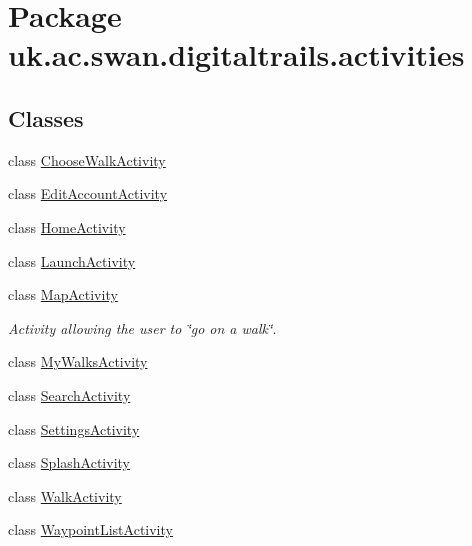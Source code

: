 \hypertarget{namespaceuk_1_1ac_1_1swan_1_1digitaltrails_1_1activities}{\section{Package uk.\+ac.\+swan.\+digitaltrails.\+activities}
\label{namespaceuk_1_1ac_1_1swan_1_1digitaltrails_1_1activities}
}
\subsection*{Classes}
\begin{DoxyCompactItemize}
\item 
class \hyperlink{classuk_1_1ac_1_1swan_1_1digitaltrails_1_1activities_1_1_choose_walk_activity}{Choose\+Walk\+Activity}
\item 
class \hyperlink{classuk_1_1ac_1_1swan_1_1digitaltrails_1_1activities_1_1_edit_account_activity}{Edit\+Account\+Activity}
\item 
class \hyperlink{classuk_1_1ac_1_1swan_1_1digitaltrails_1_1activities_1_1_home_activity}{Home\+Activity}
\item 
class \hyperlink{classuk_1_1ac_1_1swan_1_1digitaltrails_1_1activities_1_1_launch_activity}{Launch\+Activity}
\item 
class \hyperlink{classuk_1_1ac_1_1swan_1_1digitaltrails_1_1activities_1_1_map_activity}{Map\+Activity}
\begin{DoxyCompactList}\small\item\em Activity allowing the user to \char`\"{}go on a walk\char`\"{}. \end{DoxyCompactList}\item 
class \hyperlink{classuk_1_1ac_1_1swan_1_1digitaltrails_1_1activities_1_1_my_walks_activity}{My\+Walks\+Activity}
\item 
class \hyperlink{classuk_1_1ac_1_1swan_1_1digitaltrails_1_1activities_1_1_search_activity}{Search\+Activity}
\item 
class \hyperlink{classuk_1_1ac_1_1swan_1_1digitaltrails_1_1activities_1_1_settings_activity}{Settings\+Activity}
\item 
class \hyperlink{classuk_1_1ac_1_1swan_1_1digitaltrails_1_1activities_1_1_splash_activity}{Splash\+Activity}
\item 
class \hyperlink{classuk_1_1ac_1_1swan_1_1digitaltrails_1_1activities_1_1_walk_activity}{Walk\+Activity}
\item 
class \hyperlink{classuk_1_1ac_1_1swan_1_1digitaltrails_1_1activities_1_1_waypoint_list_activity}{Waypoint\+List\+Activity}
\end{DoxyCompactItemize}
